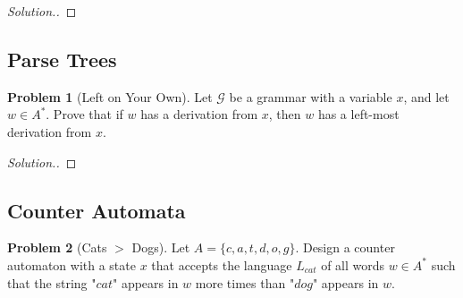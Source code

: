 \documentclass[11pt]{article}
\theoremstyle{theorem} %
\theoremstyle{definition} %
\newtheorem{problem}                    {{\color{BurntOrange}Problem}}
\theoremstyle{remark} %
\begin{document}
\begin{proof}
    [Solution.]
\end{proof}

\subsection*{Parse Trees}

\begin{problem}
    [Left on Your Own]
    Let \(\mathcal G\) be a grammar with a variable \(x\), and let \(w \in A^*\).
    Prove that if \(w\) has a derivation from \(x\), then \(w\) has a left-most derivation from \(x\).
\end{problem}

\begin{proof}
    [Solution.]
\end{proof}

\subsection*{Counter Automata}

\begin{problem}
    [Cats \(>\) Dogs]
    Let \(A = \{c, a, t, d, o, g\}\). 
    Design a counter automaton with a state \(x\) that accepts the language \(L_{cat}\) of all words \(w \in A^*\) such that the string "\(cat\)" appears in \(w\) more times than "\(dog\)" appears in \(w\).
\end{problem}
\end{document}
